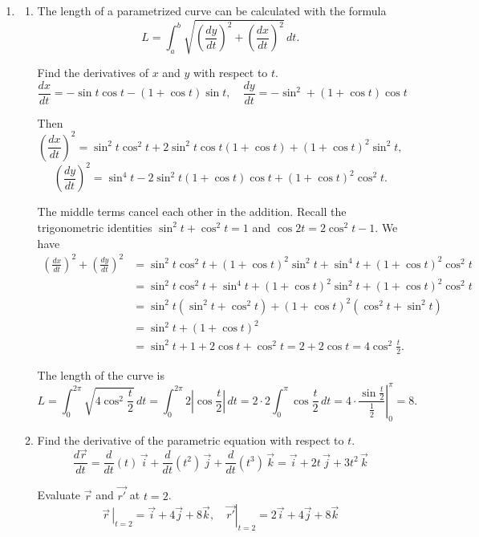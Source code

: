 \documentclass[a4paper, 12pt]{article}
\renewcommand{\headrulewidth}{0pt}
\begin{document}
\newpage
\pagestyle{fancy}
\renewcommand{\headrulewidth}{1pt}


\begin{enumerate}[leftmargin=*,label=\textbf{\arabic*.}]
\item \begin{enumerate}[leftmargin=*,label=\textbf{\alph*.}]
\item The length of a parametrized curve can be calculated with the formula
\[L=\int_a^b\sqrt{\left(\frac{dy}{dt}\right)^2+\left(\frac{dx}{dt}\right)^2}\,dt.\]

Find the derivatives of $x$ and $y$ with respect to $t$.
\[\frac{dx}{dt}=-\sin t\cos t - (1+\cos t)\sin t, \quad \frac{dy}{dt}=-\sin^2 + (1+\cos t)\cos t\]

Then
\[\left(\frac{dx}{dt}\right)^2=\sin^2t\cos^2t+2\sin^2t\cos t(1+\cos t)+(1+\cos t)^2\sin^2t,\]
\[\left(\frac{dy}{dt}\right)^2=\sin^4t-2\sin^2t(1+\cos t)\cos t+(1+\cos t)^2\cos ^2 t.\]

The middle terms cancel each other in the addition. Recall the trigonometric identities $\sin^2t+\cos^2t=1$ and $\cos 2t=2\cos^2 t-1$. We have
\begin{align*}\left(\frac{dx}{dt}\right)^2+\left(\frac{dy}{dt}\right)^2&=\sin^2t\cos^2t+(1+\cos t)^2\sin^2t+\sin^4t+(1+\cos t)^2\cos^2t\\[1em]&=\sin^2t\cos^2t+\sin^4t+(1+\cos t)^2\sin^2t+(1+\cos t)^2\cos^2t\\[1em]&=\sin^2t(\sin^2t+\cos^2t)+(1+\cos t)^2(\cos^2t+\sin^2t)\\[1em]&=\sin^2t+(1+\cos t)^2\\[1em]&=\sin^2t+1+2\cos t+\cos^2t=2+2\cos t =4\cos^2\frac t2.\end{align*}

The length of the curve is
\[L=\int_{0}^{2\pi}\sqrt{4\cos^2\frac t2}\,dt=\int_0^{2\pi}2\left|\cos\frac t2\right|\,dt=2\cdot 2\int_0^{\pi}\cos\frac t2\,dt=\left.4\cdot\frac{\sin\frac t2}{\frac12}\right|_0^\pi=\boxed8.\]

\item Find the derivative of the parametric equation with respect to $t$.
\[\frac{d\vec r}{dt}=\frac d{dt}\left(t\right)\,\vec i+\frac d{dt}\left(t^2\right)\,\vec j+\frac d{dt}\left(t^3\right)\,\vec k=\vec i+ 2t\,\vec j+3t^2\,\vec k\]

Evaluate $\vec r$ and $\vec {r'}$ at $t=2$.
\[\left.\vec r\,\right|_{t=2}=\vec i+ 4\vec j+8\vec k,\quad \left.\vec{r'}\right|_{t=2}=2\vec i+4\vec j+8\vec k\]


\end{enumerate}
\end{enumerate}
\end{document}
